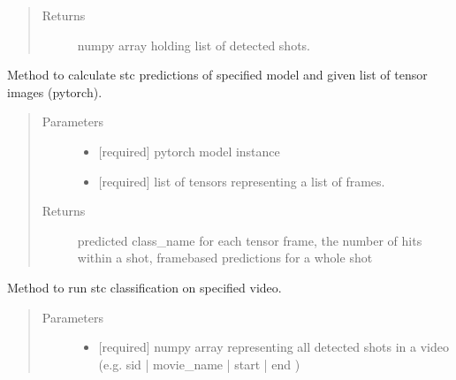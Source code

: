 \documentclass[letterpaper,10pt,english,openany,oneside]{sphinxmanual}
\begin{document}
\begin{fulllineitems}
\begin{fulllineitems}
\begin{quote}
\begin{description}
\item[{Returns}] \leavevmode
numpy array holding list of detected shots.

\end{description}\end{quote}

\end{fulllineitems}


\begin{fulllineitems}
\label{\detokenize{STC:stc.STC.STC.runModel}}
Method to calculate stc predictions of specified model and given list of tensor images (pytorch).
\begin{quote}\begin{description}
\item[{Parameters}] \leavevmode\begin{itemize}
\item {} 
 \textendash{} {[}required{]} pytorch model instance

\item {} 
 \textendash{} {[}required{]} list of tensors representing a list of frames.

\end{itemize}

\item[{Returns}] \leavevmode
predicted class\_name for each tensor frame,
the number of hits within a shot,
frame\sphinxhyphen{}based predictions for a whole shot

\end{description}\end{quote}

\end{fulllineitems}


\begin{fulllineitems}
\label{\detokenize{STC:stc.STC.STC.runOnSingleVideo}}
Method to run stc classification on specified video.
\begin{quote}\begin{description}
\item[{Parameters}] \leavevmode\begin{itemize}
\item {} 
 \textendash{} {[}required{]} numpy array representing all detected shots in a video
(e.g. sid | movie\_name | start | end )


\end{itemize}
\end{description}
\end{quote}
\end{fulllineitems}
\end{fulllineitems}
\end{document}
